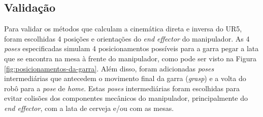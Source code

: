 \begin{figure}[htb!]
{		\label{fig:wrist-down}%
	}%
	\vfill%
	\hspace{1cm}%
\end{figure}

\subsection{Validação}
Para validar os métodos que calculam a cinemática direta e inversa do UR5, foram escolhidas
4 posições e orientações do \textit{end effector} do manipulador. As 4 \textit{poses} especificadas
simulam 4 posicionamentos possíveis para a garra pegar a lata que se encontra na mesa à frente
do manipulador, como pode ser visto na Figura \ref{fig:posicionamentos-da-garra}. Além disso,
foram adicionadas \textit{poses} intermediárias que antecedem o movimento final da garra
(\textit{grasp}) e a volta do robô para a \textit{pose} de \textit{home}. Estas \textit{poses}
intermediárias foram escolhidas para evitar colisões dos componentes mecânicos do manipulador,
principalmente do \textit{end effector}, com a lata de cerveja e/ou com as mesas.


